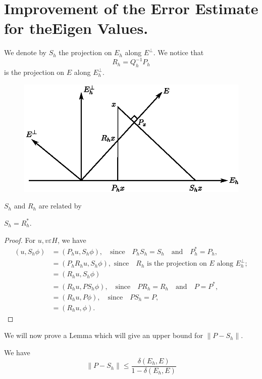 \section[Improvement of the Error Estimate for the...]{Improvement of
  the Error Estimate for the\hfil\break Eigen 
  Values.} \label{chap8:sec7} We denote by $S_h$ the projection on
$E_h$ along $E^\bot$. We notice that 
$$
R_h=Q_h^{-1}P_h
$$
is the projection on $E$ along $E_h^\bot$. 
\begin{figure}[H]
\centering
\includegraphics{figure/fig8.1.eps}
\caption{}\label{fig8.1}
\end{figure}\pageoriginale
\noindent
$S_h$ and $R_h$ are related by 
\begin{lem}\label{chap8:lem3}
$S_h=R_h^*$.
\end{lem}

\begin{proof}
For $u, v \varepsilon H$, we have 
\begin{align*}
(u,S_h\phi) &= (P_hu,S_h\phi),\quad\text{since}\quad P_hS_h=S_h\quad
\text{and}\quad P_h^*=P_h,\\
&= (P_hR_hu,S_h\phi),\text{ since}\quad R_h \text{ is the
projection on $E$ along } E_h^\bot;\\
&= (R_hu, S_h\phi)\\
&= (R_hu,PS_h\phi),\quad\text{since}\quad PR_h=R_h\quad\text{and}
\quad P=P^*,\\
&= (R_hu, P\phi),\quad\text{since}\quad PS_h=P,\\
&= (R_hu,\phi).
\end{align*}
\end{proof}

We will now prove a Lemma which will give an upper bound for
$\parallel P-S_h\parallel$.

\begin{lem}\label{chap8:lem4}
We have 
\begin{equation}\label{chap8:eq8.20}
\parallel P-S_h\parallel \leq \frac{\delta(E_h,E)}{1-\delta (E_h,E)} 
\end{equation}\pageoriginale
\end{lem}

